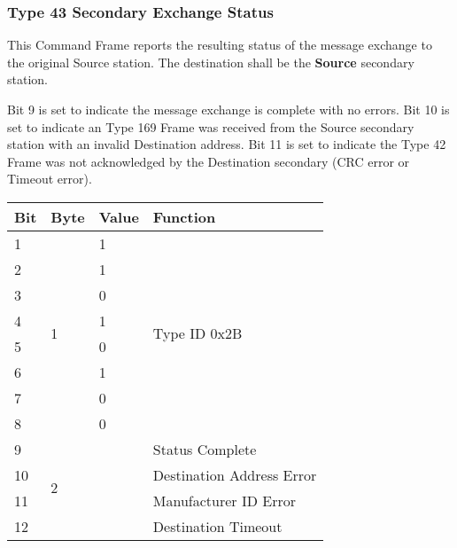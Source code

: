 \documentclass[]{article}
\begin{document}
\clearpage
\subsubsection {Type 43 Secondary Exchange Status}
This Command Frame reports the resulting status of the message exchange to the original Source station. The destination shall be the \textbf{Source} secondary station.

Bit 9 is set to indicate the message exchange is complete with no errors. Bit 10 is set to indicate an Type 169 Frame was received from the Source secondary station with an invalid Destination address. Bit 11 is set to indicate the Type 42 Frame was not acknowledged by the Destination secondary (CRC error or Timeout error).

\begin{table}[ht]
	\centering
	\begin{tabular}{llll}
		\hline
		\textbf{Bit} & \textbf{Byte}      & \textbf{Value}    & \textbf{Function}             \\ \hline
		1            & \multirow{8}{*}{1} & 1                 & \multirow{8}{*}{Type ID 0x2B} \\
		2            &                    & 1                 &                               \\
		3            &                    & 0                 &                               \\
		4            &                    & 1                 &                               \\
		5            &                    & 0                 &                               \\
		6            &                    & 1                 &                               \\
		7            &                    & 0                 &                               \\
		8            &                    & 0                 &                               \\ \hline
		9            & \multirow{8}{*}{2} & \multirow{4}{*}{} & Status Complete               \\
		10           &                    &                   & Destination Address Error     \\
		11           &                    &                   & Manufacturer ID Error         \\
		12           &                    &                   & Destination Timeout           \\ \cline{3-4} 

\end{tabular}
\end{table}
\end{document}
